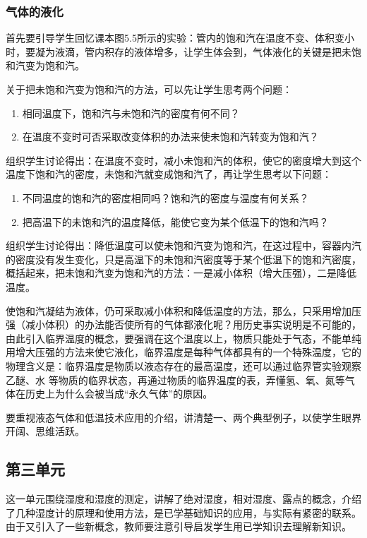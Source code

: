 \subsubsection{气体的液化}

首先要引导学生回忆课本图5.5所示的实验：管内的饱和汽在温度不变、体积变小时，要凝为液滴，管内积存的液体增多，让学生体会到，气体液化的关键是把未饱和汽变为饱和汽。

关于把未饱和汽变为饱和汽的方法，可以先让学生思考两个问题：
\begin{enumerate}
    \item 相同温度下，饱和汽与未饱和汽的密度有何不同？
    \item 在温度不变时可否采取改变体积的办法来使未饱和汽转变为饱和汽？
\end{enumerate}
组织学生讨论得出：在温度不变时，减小未饱和汽的体积，使它的密度增大到这个温度下饱和汽的密度，未饱和汽就变成饱和汽了，再让学生思考以下问题：
\begin{enumerate}
\item 不同温度的饱和汽的密度相同吗？饱和汽的密度与温度有何关系？    \item 把高温下的未饱和汽的温度降低，能使它变为某个低温下的饱和汽吗？
\end{enumerate}
组织学生讨论得出：降低温度可以使未饱和汽变为饱和汽，在这过程中，容器内汽的密度没有发生变化，只是高温下的未饱和汽密度等于某个低温下的饱和汽密度，概括起来，把未饱和汽变为饱和汽的方法：一是减小体积（增大压强），二是降低温度。

使饱和汽凝结为液体，仍可采取减小体积和降低温度的方法，那么，只采用增加压强（减小体积）的办法能否使所有的气体都液化呢？用历史事实说明是不可能的，由此引入临界温度的概念，要强调在这个温度以上，物质只能处于气态，不能单纯用增大压强的方法来使它液化，临界温度是每种气体都具有的一个特殊温度，它的物理含义是：临界温度是物质以液态存在的最高温度，还可以通过临界管实验观察乙醚、水
等物质的临界状态，再通过物质的临界温度的表，弄懂氢、氧、氮等气体在历史上为什么会被当成“永久气体”的原因。

要重视液态气体和低温技术应用的介绍，讲清楚一、两个典型例子，以使学生眼界开阔、思维活跃。

\subsection{第三单元}
这一单元围绕湿度和湿度的测定，讲解了绝对湿度，相对湿度、露点的概念，介绍了几种湿度计的原理和使用方法，是已学基础知识的应用，与实际有紧密的联系。由于又引入了一些新概念，教师要注意引导启发学生用已学知识去理解新知识。

